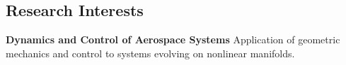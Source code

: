 \subsection*{Research Interests}

\textbf{Dynamics and Control of Aerospace Systems}
Application of geometric mechanics and control to systems evolving on nonlinear manifolds.
